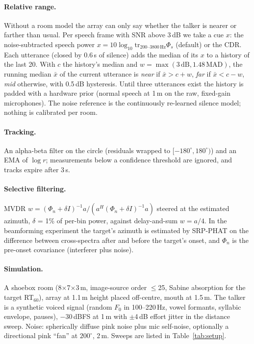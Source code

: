 \paragraph{Relative range.} Without a room model the array can only say
whether the talker is nearer or farther than usual. Per speech frame with
SNR above 3\,dB we take a cue $x$: the noise-subtracted speech power
$x=10\log_{10}\mathrm{tr}_{200\text{--}3800\,\text{Hz}}\Phi_s$ (default) or the CDR.
Each utterance (closed by 0.6\,s of silence) adds the median of its $x$ to
a history of the last 20. With $c$ the history's median and
$w=\max(3\,\text{dB}, 1.48\,\mathrm{MAD})$, the running median $\bar x$ of
the current utterance is \emph{near} if $\bar x>c+w$, \emph{far} if
$\bar x<c-w$, \emph{mid} otherwise, with 0.5\,dB hysteresis. Until three
utterances exist the history is padded with a hardware prior (normal
speech at 1\,m on the raw, fixed-gain microphones). The noise reference is
the continuously re-learned silence model; nothing is calibrated per room.

\paragraph{Tracking.} An alpha-beta filter on the circle (residuals
wrapped to $[-180^\circ,180^\circ)$) and an EMA of $\log r$; measurements
below a confidence threshold are ignored, and tracks expire after 3\,s.

\paragraph{Selective filtering.} MVDR
$w=(\Phi_n+\delta I)^{-1}a/(a^H(\Phi_n+\delta I)^{-1}a)$ steered at the
estimated azimuth, $\delta$ = 1\% of per-bin power, against delay-and-sum
$w=a/4$. In the beamforming experiment the target's azimuth is estimated
by SRP-PHAT on the difference between cross-spectra after and before the
target's onset, and $\Phi_n$ is the pre-onset covariance (interferer plus
noise).

\paragraph{Simulation.} A shoebox room (8$\times$7$\times$3\,m,
image-source order $\le$25, Sabine absorption for the target RT$_{60}$),
array at 1.1\,m height placed off-centre, mouth at 1.5\,m. The talker is
a synthetic voiced signal (random $F_0$ in 100--220\,Hz, vowel formants,
syllabic envelope, pauses), $-30$\,dBFS at 1\,m with $\pm$4\,dB effort
jitter in the distance sweep. Noise: spherically diffuse pink noise
\cite{habets2008diffuse} plus mic self-noise, optionally a directional
pink ``fan'' at $200^\circ$, 2\,m. Sweeps are listed in
Table~\ref{tab:setup}.

